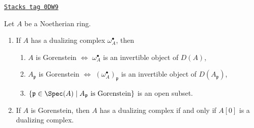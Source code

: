 \begin{lemma}[Gorenstein]
\label{dualizing-lemma-gorenstein}
\href{https://stacks.math.columbia.edu/tag/0DW9}{\texttt{Stacks tag 0DW9}}

Let $A$ be a Noetherian ring.
\begin{enumerate}
\item If $A$ has a dualizing complex $\omega_A^\bullet$, then
\begin{enumerate}
\item $A$ is Gorenstein $\Leftrightarrow$ $\omega_A^\bullet$ is an invertible
object of $D(A)$,
\item $A_\mathfrak p$ is Gorenstein $\Leftrightarrow$
$(\omega_A^\bullet)_\mathfrak p$ is an invertible object of
$D(A_\mathfrak p)$,
\item $\{\mathfrak p \in \Spec(A) \mid A_\mathfrak p\text{ is Gorenstein}\}$
is an open subset.
\end{enumerate}
\item If $A$ is Gorenstein, then $A$ has a dualizing complex if and
only if $A[0]$ is a dualizing complex.
\end{enumerate}
\end{lemma}

